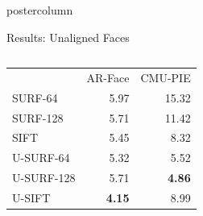 \documentclass[final,hyperref={pdfpagelabels=false}]{beamer}
\begin{document}
\begin{frame}
\begin{columns}
\begin{column}{.49\textwidth}
\begin{beamercolorbox}[center,wd=\textwidth]{postercolumn}
\begin{minipage}[T]{.95\textwidth}
{\begin{block}{Results: Unaligned Faces}
\begin{columns}
\begin{column}{.59\textwidth}
\begin{table}
\begin{tabular}{@{} p{.4\linewidth} r r @{}}
                      \cmidrule(l){2-3}
                      &   AR-Face       & CMU-PIE  \\
                      \cmidrule(r){1-1}  \cmidrule(lr){2-2}  \cmidrule(l){3-3}
                      SURF-64     &   5.97          & 15.32    \\
                      SURF-128    &   5.71          & 11.42    \\
                      SIFT        &   5.45          & 8.32     \\
                      \addlinespace
                      U-SURF-64   &   5.32          & 5.52     \\
                      U-SURF-128  &   5.71          & \textbf{4.86}  \\
                      U-SIFT      &   \textbf{4.15} & 8.99     \\
                      \bottomrule
                    \end{tabular}
                  \end{table}
                \end{column}
\end{columns}
\end{block}}
\end{minipage}
\end{beamercolorbox}
\end{column}
\end{columns}
\end{frame}
\end{document}
